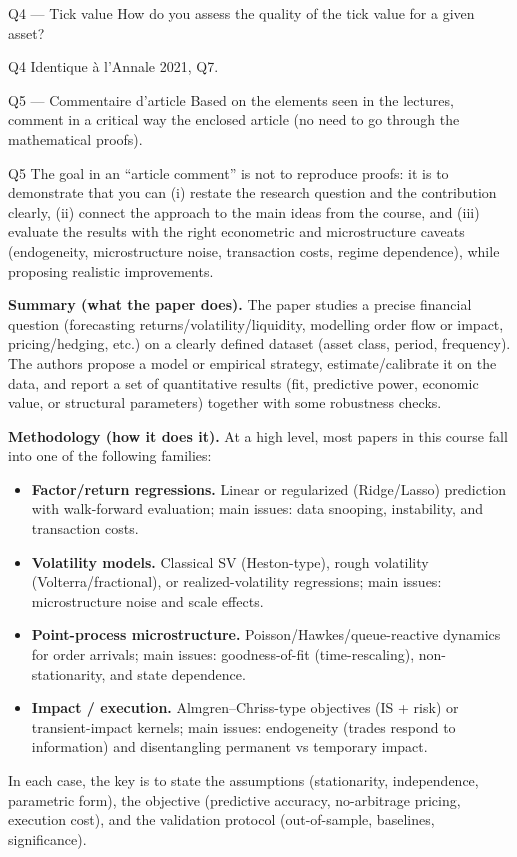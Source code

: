 \begin{questionbox}{Q4 --- Tick value}
How do you assess the quality of the tick value for a given asset?
\end{questionbox}

\begin{solutionbox}{Q4}
Identique à l'Annale 2021, Q7.
\end{solutionbox}

\begin{questionbox}{Q5 --- Commentaire d'article}
Based on the elements seen in the lectures, comment in a critical way the enclosed article (no need to go through the mathematical proofs).
\end{questionbox}

\begin{solutionbox}{Q5}
The goal in an ``article comment'' is not to reproduce proofs: it is to demonstrate that you can (i) restate the research question and the contribution clearly, (ii) connect the approach to the main ideas from the course, and (iii) evaluate the results with the right econometric and microstructure caveats (endogeneity, microstructure noise, transaction costs, regime dependence), while proposing realistic improvements.

\medskip
\textbf{Summary (what the paper does).} The paper studies a precise financial question (forecasting returns/volatility/liquidity, modelling order flow or impact, pricing/hedging, etc.) on a clearly defined dataset (asset class, period, frequency). The authors propose a model or empirical strategy, estimate/calibrate it on the data, and report a set of quantitative results (fit, predictive power, economic value, or structural parameters) together with some robustness checks.

\medskip
\textbf{Methodology (how it does it).} At a high level, most papers in this course fall into one of the following families:
\begin{itemize}[leftmargin=*]
  \item \textbf{Factor/return regressions.} Linear or regularized (Ridge/Lasso) prediction with walk-forward evaluation; main issues: data snooping, instability, and transaction costs.
  \item \textbf{Volatility models.} Classical SV (Heston-type), rough volatility (Volterra/fractional), or realized-volatility regressions; main issues: microstructure noise and scale effects.
  \item \textbf{Point-process microstructure.} Poisson/Hawkes/queue-reactive dynamics for order arrivals; main issues: goodness-of-fit (time-rescaling), non-stationarity, and state dependence.
  \item \textbf{Impact / execution.} Almgren--Chriss-type objectives (IS + risk) or transient-impact kernels; main issues: endogeneity (trades respond to information) and disentangling permanent vs temporary impact.
\end{itemize}
In each case, the key is to state the assumptions (stationarity, independence, parametric form), the objective (predictive accuracy, no-arbitrage pricing, execution cost), and the validation protocol (out-of-sample, baselines, significance).


\end{solutionbox}
